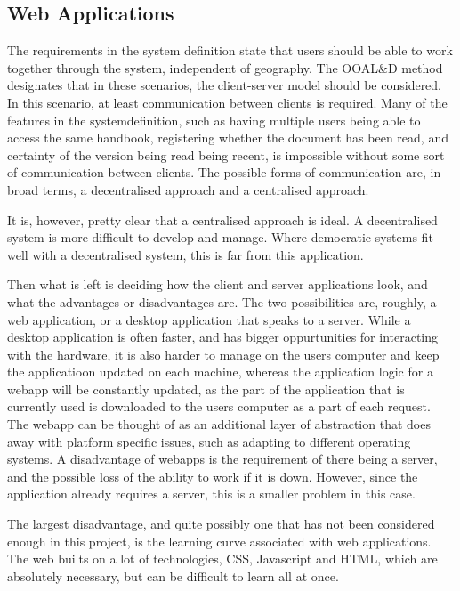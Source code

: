 \subsection{Web Applications}
The requirements in the system definition state that users should be able to work together through the system, independent of geography.
The OOAL\&D method designates that in these scenarios, the client-server model should be considered.
In this scenario, at least communication between clients is required. Many of the features in the systemdefinition, such as having multiple users being able to access the same handbook, registering whether the document has been read, and certainty of the version being read being recent, is impossible without some sort of communication between clients. The possible forms of communication are, in broad terms, a decentralised approach and a centralised approach.

It is, however, pretty clear that a centralised approach is ideal. A decentralised system is more difficult to develop and manage. Where democratic systems fit well with a decentralised system, this is far from this application.

Then what is left is deciding how the client and server applications look, and what the advantages or disadvantages are. The two possibilities are, roughly, a web application, or a desktop application that speaks to a server. While a desktop application is often faster, and has bigger oppurtunities for interacting with the hardware, it is also harder to manage on the users computer and keep the applicatioon updated on each machine, whereas the application logic for a webapp will be constantly updated, as the part of the application that is currently used is downloaded to the users computer as a part of each request. The webapp can be thought of as an additional layer of abstraction that does away with platform specific issues, such as adapting to different operating systems. A disadvantage of webapps is the requirement of there being a server, and the possible loss of the ability to work if it is down. However, since the application already requires a server, this is a smaller problem in this case.

The largest disadvantage, and quite possibly one that has not been considered enough in this project, is the learning curve associated with web applications. The web builts on a lot of technologies, CSS, Javascript and HTML, which are absolutely necessary, but can be difficult to learn all at once.

